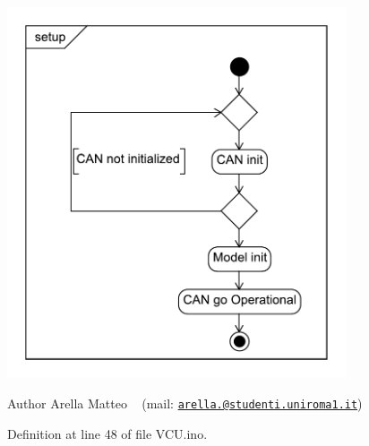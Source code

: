  
\begin{DoxyImage}
\includegraphics[width=10cm]{setup_activity}
\end{DoxyImage}


\begin{DoxyAuthor}{Author}
Arella Matteo ~\newline
 (mail\+: \href{mailto:arella.1646983@studenti.uniroma1.it}{\tt arella.@studenti.\+uniroma1.\+it}) 
\end{DoxyAuthor}


Definition at line 48 of file V\+C\+U.\+ino.

